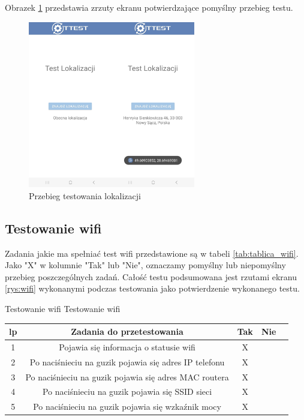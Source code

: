 Obrazek \ref{rys:gps} przedstawia zrzuty ekranu potwierdzające pomyślny przebieg testu.

\begin{figure}[!hbt]
	\begin{center}
		\includegraphics[angle=360, width=0.65\textwidth]{rys/punkt5/gps.jpg}
		\caption{Przebieg testowania lokalizacji}
		\label{rys:gps}
	\end{center}
\end{figure} 

\newpage


\subsection{Testowanie wifi}  

Zadania jakie ma spełniać test wifi przedstawione są w tabeli \ref{tab:tablica_wifi}. Jako "X" w kolumnie "Tak" lub "Nie", oznaczamy pomyślny lub niepomyślny przebieg poszczególnych zadań. Całość testu podsumowana jest rzutami ekranu \ref{rys:wifi} wykonanymi podczas testowania jako potwierdzenie wykonanego testu.

\begin{tabela}
	{Testowanie wifi}	%
	{Testowanie wifi}	%
	{
		\begin{tabular}{|c|c|c|c|c|} \hline
			\textbf{lp} & \textbf{Zadania do przetestowania} & \textbf{Tak} & \textbf{Nie} \\ \hline
			1 & Pojawia się informacja o statusie wifi & X & ~ \\ \hline
			2 & Po naciśnieciu na guzik pojawia się adres IP telefonu & X & ~ \\ \hline
			3 & Po naciśnieciu na guzik pojawia się adres MAC routera & X & ~ \\ \hline
			4 & Po naciśnieciu na guzik pojawia się SSID sieci & X & ~ \\ \hline
			5 & Po naciśnieciu na guzik pojawia się wzkaźnik mocy & X & ~ \\ \hline
	\end{tabular}	}
	\label{tab:tablica_wifi}
\end{tabela}

